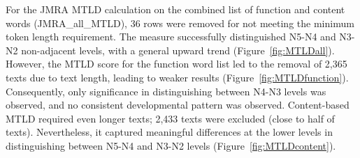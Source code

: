 
For the JMRA MTLD calculation on the combined list of function and content words (JMRA\_all\_MTLD), 36 rows were removed
for not
meeting the minimum token length requirement. The measure successfully distinguished N5-N4 and N3-N2 non-adjacent
levels, with a
general upward trend (Figure~\ref{fig:MTLDall}). However, the MTLD score for the function word list led to the removal
of 2,365
texts due to
text length, leading to weaker results (Figure~\ref{fig:MTLDfunction}). Consequently, only significance in
distinguishing
between N4-N3
levels was observed, and no consistent developmental pattern was observed. Content-based MTLD required even longer
texts; 2,433 texts were excluded (close to half of texts). Nevertheless, it captured meaningful differences at the
lower
levels in distinguishing between N5-N4 and N3-N2 levels (Figure~\ref{fig:MTLDcontent}). 


